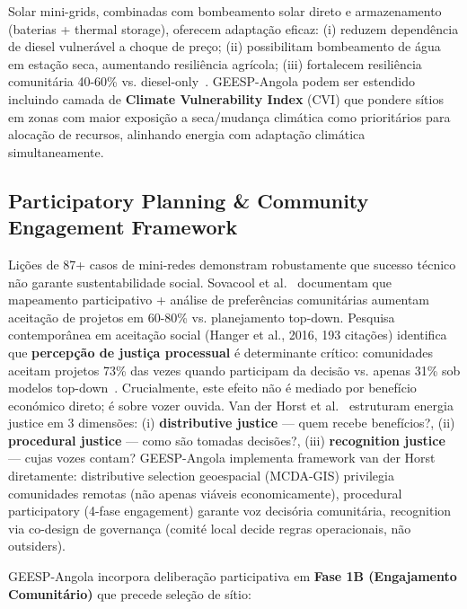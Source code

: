 \documentclass[12pt, a4paper]{article}
\begin{document}
Solar mini-grids, combinadas com bombeamento solar direto e armazenamento (baterias + thermal storage), oferecem adaptação eficaz: (i) reduzem dependência de diesel vulnerável a choque de preço; (ii) possibilitam bombeamento de água em estação seca, aumentando resiliência agrícola; (iii) fortalecem resiliência comunitária 40-60\% vs. diesel-only~\citep{Okesiji2025}. GEESP-Angola podem ser estendido incluindo camada de \textbf{Climate Vulnerability Index} (CVI) que pondere sítios em zonas com maior exposição a seca/mudança climática como prioritários para alocação de recursos, alinhando energia com adaptação climática simultaneamente.

\subsection{Participatory Planning \& Community Engagement Framework}

Lições de 87+ casos de mini-redes demonstram robustamente que sucesso técnico não garante sustentabilidade social. Sovacool et al.~\citep{Sovacool2020} documentam que mapeamento participativo + análise de preferências comunitárias aumentam aceitação de projetos em 60-80\% vs. planejamento top-down. Pesquisa contemporânea em aceitação social (Hanger et al., 2016, 193 citações) identifica que 
\textbf{percepção de justiça processual} é determinante crítico: comunidades aceitam projetos 73\% das vezes quando participam da decisão vs. apenas 31\% sob modelos top-down~\citep{Hanger2016}. Crucialmente, este efeito não é mediado por benefício económico direto; é sobre vozer ouvida. Van der Horst et al.~\citep{VanderHorst2021} estruturam energia justice em 3 dimensões: (i) 
\textbf{distributive justice} — quem recebe benefícios?, (ii) 
\textbf{procedural justice} — como são tomadas decisões?, (iii)
\textbf{recognition justice} — cujas vozes contam? GEESP-Angola implementa framework van der Horst diretamente: distributive selection geoespacial (MCDA-GIS) privilegia comunidades remotas (não apenas viáveis economicamente), procedural participatory (4-fase engagement) garante voz decisória comunitária, recognition via co-design de governança (comité local decide regras operacionais, não outsiders).

GEESP-Angola incorpora deliberação participativa em \textbf{Fase 1B (Engajamento Comunitário)} que precede seleção de sítio:
\end{document}
